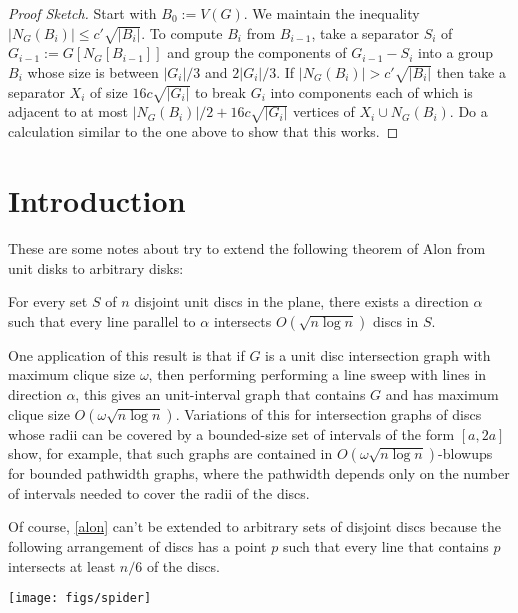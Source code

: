\documentclass{patmorin}
\renewcommand{\le}{\leqslant}
\begin{document}
\begin{proof}[Proof Sketch]
  Start with $B_0:=V(G)$.  We maintain the inequality $|N_G(B_i)|\le c'\sqrt{|B_i|}$. To compute $B_i$ from $B_{i-1}$, take a separator $S_i$ of $G_{i-1}:=G[N_G[B_{i-1}]]$ and group the components of $G_{i-1}-S_i$ into a group $B_i$ whose size is between $|G_i|/3$ and $2|G_i|/3$.  If $|N_G(B_i)|> c'\sqrt{|B_i|}$ then take a separator $X_i$ of size $16c\sqrt{|G_i|}$ to break $G_i$ into components each of which is adjacent to at most $|N_G(B_i)|/2+16c\sqrt{|G_i|}$ vertices of $X_i\cup N_G(B_i)$.  Do a calculation similar to the one above to show that this works.
\end{proof}



\section{Introduction}

These are some notes about try to extend the following theorem of Alon from unit disks to arbitrary disks:

\begin{thm}[Alon]\label{alon}
  For every set $S$ of $n$ disjoint unit discs in the plane, there exists a direction $\alpha$ such that every line parallel to $\alpha$ intersects $O(\sqrt{n\log n})$ discs in $S$.
\end{thm}

One application of this result is that if $G$ is a unit disc intersection graph with maximum clique size $\omega$, then performing performing a line sweep with lines in direction $\alpha$, this gives an unit-interval graph that contains $G$ and has maximum clique size $O(\omega \sqrt{n\log n})$.  Variations of this for intersection graphs of discs whose radii can be covered by a bounded-size set of intervals of the form $[a,2a]$ show, for example, that such graphs are contained in $O(\omega\sqrt{n\log n})$-blowups for bounded pathwidth graphs, where the pathwidth depends only on the number of intervals needed to cover the radii of the discs.

Of course, \cref{alon} can't be extended to arbitrary sets of disjoint discs because the following arrangement of discs has a point $p$ such that every line that contains $p$ intersects at least $n/6$ of the discs.

\begin{center}
  \texttt{[image: figs/spider]}
\end{center}
\end{document}
